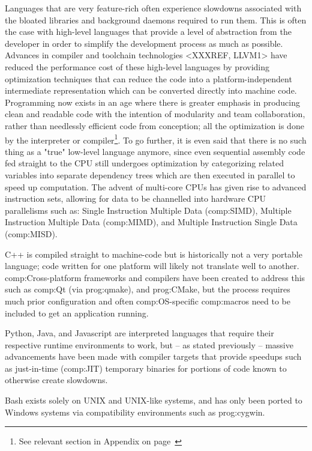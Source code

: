 Languages that are very feature-rich often experience slowdowns associated with the bloated libraries and background daemons required to run them. This is often the case with high-level languages that provide a level of abstraction from the developer in order to simplify the development process as much as possible. Advances in compiler and toolchain  technologies <XXXREF, LLVM1> have reduced the performance cost of these high-level languages by providing optimization techniques that can reduce the code into a platform-independent intermediate representation which can be converted directly into machine code. Programming now exists in an age where there is greater emphasis in producing clean and readable code with the intention of modularity and team collaboration, rather than needlessly efficient code from conception; all the optimization is done by the interpreter or compiler\footnote{See relevant section in Appendix on page~\pageref{ref:app:compiler}}. To go further, it is even said that there is no such thing as a "true" low-level language anymore, since even sequential assembly code fed straight to the CPU still undergoes optimization by categorizing related variables into separate dependency trees which are then executed in parallel to speed up computation. The advent of multi-core CPUs has given rise to advanced instruction sets, allowing for data to be channelled into hardware CPU parallelisms such as: Single Instruction Multiple Data (\gls{comp:SIMD}), Multiple Instruction Multiple Data (\gls{comp:MIMD}), and Multiple Instruction Single Data (\gls{comp:MISD}).

C++ is compiled straight to machine-code but is historically not a  very portable language; code written for one platform will likely not translate well to another. \gls{comp:Cross-platform} frameworks and compilers have been created to address this such as \gls{comp:Qt} (via \gls{prog:qmake}), and \gls{prog:CMake}, but the process requires much prior configuration and often \gls{comp:OS}-specific \gls{comp:macros} need to be included to get an application running.

Python, Java, and Javascript are interpreted languages that require their respective runtime environments to work, but – as stated previously – massive advancements have been made with compiler targets that provide speedups such as just-in-time (\gls{comp:JIT}) temporary binaries for portions of code known to otherwise create slowdowns. 

Bash exists solely on UNIX and UNIX-like systems, and has only been ported to Windows systems via compatibility environments such as \gls{prog:cygwin}. 

